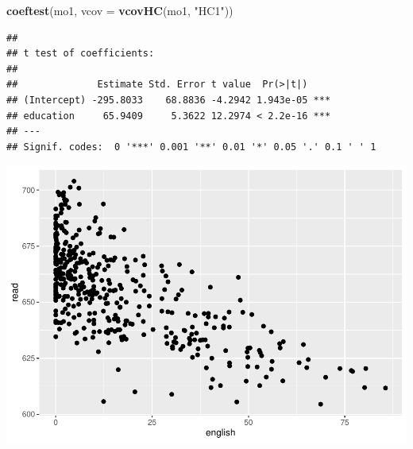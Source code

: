\documentclass[
]{book}
\newenvironment{Shaded}{\begin{snugshade}}{\end{snugshade}}
\newcommand{\DataTypeTok}[1]{\textcolor[rgb]{0.13,0.29,0.53}{#1}}
\newcommand{\DecValTok}[1]{\textcolor[rgb]{0.00,0.00,0.81}{#1}}
\newcommand{\KeywordTok}[1]{\textcolor[rgb]{0.13,0.29,0.53}{\textbf{#1}}}
\newcommand{\NormalTok}[1]{#1}
\newcommand{\OperatorTok}[1]{\textcolor[rgb]{0.81,0.36,0.00}{\textbf{#1}}}
\newcommand{\StringTok}[1]{\textcolor[rgb]{0.31,0.60,0.02}{#1}}
\begin{document}
\begin{Shaded}
\begin{Highlighting}[]
\KeywordTok{coeftest}\NormalTok{(mo1, }\DataTypeTok{vcov =} \KeywordTok{vcovHC}\NormalTok{(mo1, }\StringTok{"HC1"}\NormalTok{))  }
\end{Highlighting}
\end{Shaded}

\begin{verbatim}
## 
## t test of coefficients:
## 
##              Estimate Std. Error t value  Pr(>|t|)    
## (Intercept) -295.8033    68.8836 -4.2942 1.943e-05 ***
## education     65.9409     5.3622 12.2974 < 2.2e-16 ***
## ---
## Signif. codes:  0 '***' 0.001 '**' 0.01 '*' 0.05 '.' 0.1 ' ' 1
\end{verbatim}

\begin{Shaded}
\end{Shaded}

\includegraphics{Metrics_files/figure-latex/unnamed-chunk-22-2.pdf}
\end{document}
